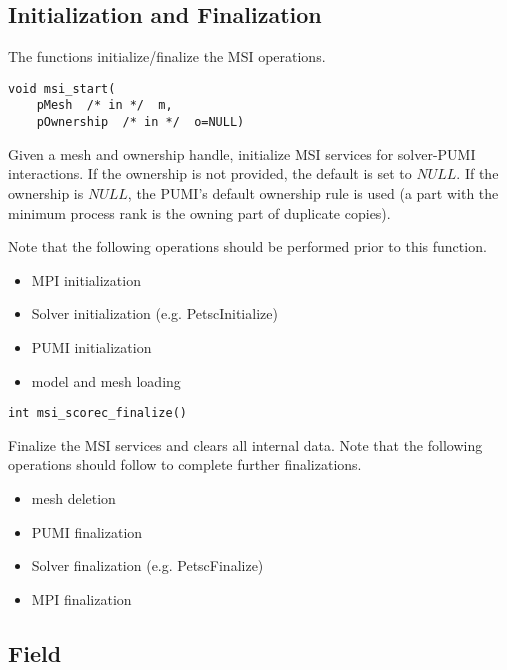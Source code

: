 \subsection{Initialization and Finalization}

The functions initialize/finalize the MSI operations.

\begin{verbatim}
void msi_start(
    pMesh  /* in */  m, 
    pOwnership  /* in */  o=NULL)
\end{verbatim}\vspace{-.5cm}\hspace{1cm}
Given a mesh and ownership handle, initialize MSI services for solver-PUMI interactions. If the ownership is not provided, the default is set to $NULL$. If the ownership is $NULL$, the PUMI's default ownership rule is used (a part with the minimum process rank is the owning part of duplicate copies). 

Note that the following operations should be performed prior to this function.
\begin{itemize}
\item MPI initialization
\item Solver initialization (e.g. PetscInitialize)
\item PUMI initialization 
\item model and mesh loading
\end{itemize}

\begin{verbatim}
int msi_scorec_finalize()
\end{verbatim}\vspace{-.5cm}\hspace{1cm}
Finalize the MSI services and clears all internal data. Note that the following operations should follow to complete further finalizations.
\begin{itemize}
\item mesh deletion
\item PUMI finalization
\item Solver finalization (e.g. PetscFinalize)
\item MPI finalization
\end{itemize}


\subsection{Field}

